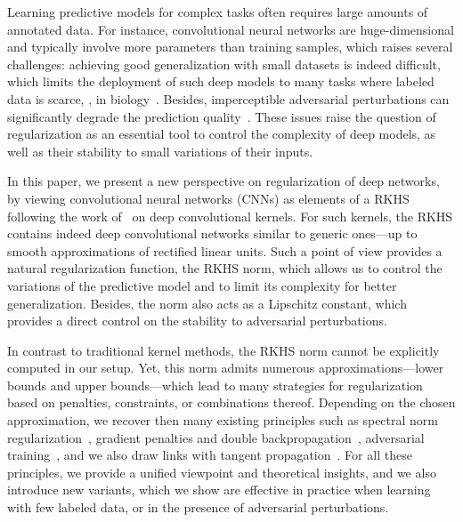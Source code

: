 
Learning predictive models for complex tasks often requires large amounts of
annotated data. For instance, convolutional neural networks are
huge-dimensional and typically involve more parameters than training samples,
which raises several challenges: achieving good generalization with small
datasets is indeed difficult, which limits the deployment of such deep models to
many tasks where labeled data is scarce, \eg, in biology~\citep{ching2018opportunities}.
Besides, imperceptible adversarial perturbations can
significantly degrade the prediction quality~\citep{szegedy2013intriguing,biggio2018wild}.
These issues raise the question of regularization as an essential
tool to control the complexity of deep models, as well as their stability
to small variations of their inputs.

In this paper, we present a new perspective on regularization of deep networks,
by viewing convolutional neural networks (CNNs) as elements of a
RKHS following the work
of~\citet{bietti2018group} on deep convolutional kernels. 
For such kernels, the RKHS contains indeed deep convolutional networks similar
to generic ones---up to smooth approximations of rectified linear units.
Such a point of view provides a
natural regularization function, the RKHS norm, which allows us to control the
variations of the predictive model and
to limit its complexity for better generalization.
Besides, the norm also acts as a Lipschitz constant, which provides a
direct control on the stability to adversarial perturbations.

In contrast to traditional kernel methods, the RKHS norm cannot be explicitly
computed in our setup. Yet, this norm admits numerous approximations---lower
bounds and upper bounds---which lead to many strategies for regularization
based on penalties, constraints, or combinations thereof.  Depending on the
chosen approximation, we recover then many existing principles such as spectral norm
regularization~\citep{cisse2017parseval,yoshida2017spectral,miyato2018spectral,sedghi2018singular},
gradient penalties and double backpropagation~\citep{drucker1991double,simon2018adversarial,gulrajani2017improved,roth2017stabilizing,roth2018adversarially,arbel2018gradient},
adversarial training~\citep{madry2018towards},
and we also draw links with tangent
propagation~\citep{simard1998transformation}.
For all these principles, we provide a unified viewpoint and
theoretical insights, and we also introduce new variants, which we show
are effective in practice when learning with few labeled data, or in 
the presence of adversarial perturbations.


